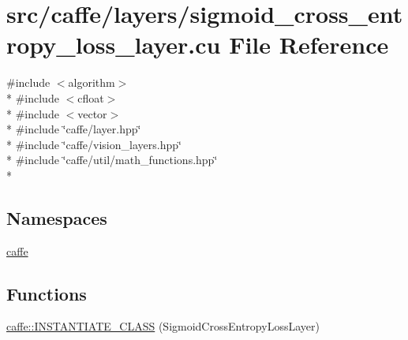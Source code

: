 \hypertarget{sigmoid__cross__entropy__loss__layer_8cu}{\section{src/caffe/layers/sigmoid\+\_\+cross\+\_\+entropy\+\_\+loss\+\_\+layer.cu File Reference}
\label{sigmoid__cross__entropy__loss__layer_8cu}
}
{\ttfamily \#include $<$algorithm$>$}\\*
{\ttfamily \#include $<$cfloat$>$}\\*
{\ttfamily \#include $<$vector$>$}\\*
{\ttfamily \#include \char`\"{}caffe/layer.\+hpp\char`\"{}}\\*
{\ttfamily \#include \char`\"{}caffe/vision\+\_\+layers.\+hpp\char`\"{}}\\*
{\ttfamily \#include \char`\"{}caffe/util/math\+\_\+functions.\+hpp\char`\"{}}\\*
\subsection*{Namespaces}
\begin{DoxyCompactItemize}
\item 
 \hyperlink{namespacecaffe}{caffe}
\end{DoxyCompactItemize}
\subsection*{Functions}
\begin{DoxyCompactItemize}
\item 
\hyperlink{namespacecaffe_a8cf0d0032a97f7af35c6ab76023160cd}{caffe\+::\+I\+N\+S\+T\+A\+N\+T\+I\+A\+T\+E\+\_\+\+C\+L\+A\+S\+S} (Sigmoid\+Cross\+Entropy\+Loss\+Layer)
\end{DoxyCompactItemize}
